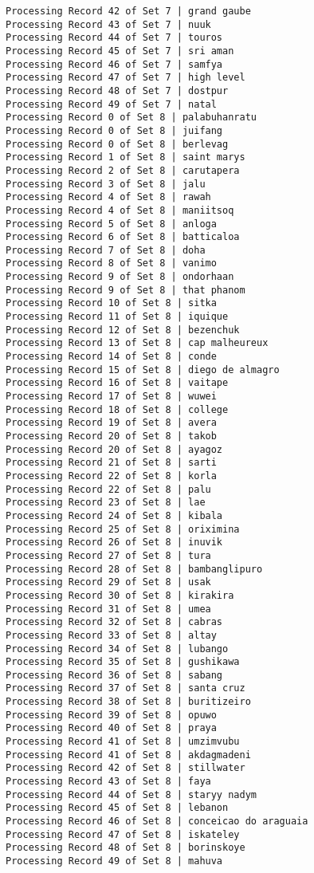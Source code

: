 \documentclass[11pt]{article}
\begin{document}
\begin{Verbatim}[commandchars=\\\{\}]
Processing Record 42 of Set 7 | grand gaube
Processing Record 43 of Set 7 | nuuk
Processing Record 44 of Set 7 | touros
Processing Record 45 of Set 7 | sri aman
Processing Record 46 of Set 7 | samfya
Processing Record 47 of Set 7 | high level
Processing Record 48 of Set 7 | dostpur
Processing Record 49 of Set 7 | natal
Processing Record 0 of Set 8 | palabuhanratu
Processing Record 0 of Set 8 | juifang
Processing Record 0 of Set 8 | berlevag
Processing Record 1 of Set 8 | saint marys
Processing Record 2 of Set 8 | carutapera
Processing Record 3 of Set 8 | jalu
Processing Record 4 of Set 8 | rawah
Processing Record 4 of Set 8 | maniitsoq
Processing Record 5 of Set 8 | anloga
Processing Record 6 of Set 8 | batticaloa
Processing Record 7 of Set 8 | doha
Processing Record 8 of Set 8 | vanimo
Processing Record 9 of Set 8 | ondorhaan
Processing Record 9 of Set 8 | that phanom
Processing Record 10 of Set 8 | sitka
Processing Record 11 of Set 8 | iquique
Processing Record 12 of Set 8 | bezenchuk
Processing Record 13 of Set 8 | cap malheureux
Processing Record 14 of Set 8 | conde
Processing Record 15 of Set 8 | diego de almagro
Processing Record 16 of Set 8 | vaitape
Processing Record 17 of Set 8 | wuwei
Processing Record 18 of Set 8 | college
Processing Record 19 of Set 8 | avera
Processing Record 20 of Set 8 | takob
Processing Record 20 of Set 8 | ayagoz
Processing Record 21 of Set 8 | sarti
Processing Record 22 of Set 8 | korla
Processing Record 22 of Set 8 | palu
Processing Record 23 of Set 8 | lae
Processing Record 24 of Set 8 | kibala
Processing Record 25 of Set 8 | oriximina
Processing Record 26 of Set 8 | inuvik
Processing Record 27 of Set 8 | tura
Processing Record 28 of Set 8 | bambanglipuro
Processing Record 29 of Set 8 | usak
Processing Record 30 of Set 8 | kirakira
Processing Record 31 of Set 8 | umea
Processing Record 32 of Set 8 | cabras
Processing Record 33 of Set 8 | altay
Processing Record 34 of Set 8 | lubango
Processing Record 35 of Set 8 | gushikawa
Processing Record 36 of Set 8 | sabang
Processing Record 37 of Set 8 | santa cruz
Processing Record 38 of Set 8 | buritizeiro
Processing Record 39 of Set 8 | opuwo
Processing Record 40 of Set 8 | praya
Processing Record 41 of Set 8 | umzimvubu
Processing Record 41 of Set 8 | akdagmadeni
Processing Record 42 of Set 8 | stillwater
Processing Record 43 of Set 8 | faya
Processing Record 44 of Set 8 | staryy nadym
Processing Record 45 of Set 8 | lebanon
Processing Record 46 of Set 8 | conceicao do araguaia
Processing Record 47 of Set 8 | iskateley
Processing Record 48 of Set 8 | borinskoye
Processing Record 49 of Set 8 | mahuva

\end{Verbatim}
\end{document}
